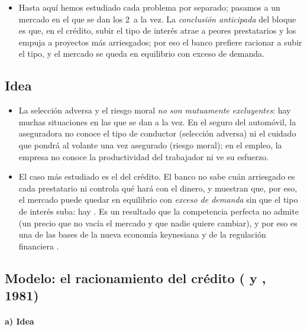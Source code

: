 \documentclass[11pt]{article}
\begin{document}
\begin{itemize}
\item Hasta aquí hemos estudiado cada problema por separado; pasamos a un mercado en el que se dan los 2~a la vez. La \emph{conclusión anticipada} del bloque es que, en el crédito, subir el tipo de interés atrae a peores prestatarios y los empuja a proyectos más arriesgados; por eso el banco prefiere racionar a subir el tipo, y el mercado se queda en equilibrio con exceso de demanda.
\end{itemize}

\subsection{Idea}\label{sec:idea-sa-rm}

\begin{itemize}
\item La selección adversa y el riesgo moral \emph{no son mutuamente excluyentes}: hay muchas situaciones en las que se dan a la vez. En el seguro del automóvil, la aseguradora no conoce el tipo de conductor (selección adversa) ni el cuidado que pondrá al volante una vez asegurado (riesgo moral); en el empleo, la empresa no conoce la productividad del trabajador ni ve su esfuerzo.
\item El caso más estudiado es el del crédito. El banco no sabe cuán arriesgado es cada prestatario ni controla qué hará con el dinero, y \textcite{StiglitzWeiss1981Credit} muestran que, por eso, el mercado puede quedar en equilibrio con \emph{exceso de demanda} sin que el tipo de interés suba: hay . Es un resultado que la competencia perfecta no admite (un precio que no vacía el mercado y que nadie quiere cambiar), y por eso es una de las bases de la nueva economía keynesiana  y de la regulación financiera .
\end{itemize}

\subsection{Modelo: el racionamiento del crédito ( y , 1981)}\label{sec:stiglitz-weiss}

\paragraph{a) Idea}
\end{document}
